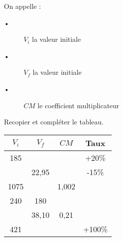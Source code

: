 

On appelle :
\begin{description}
\item[•] $V_i$ la valeur initiale
\item[•] $V_f$ la valeur initiale
\item[•] $CM$ le coefficient multiplicateur
\end{description}

Recopier et compléter le tableau. 

 \begin{tabular}{|c|c|c|c|}
 \hline 
$V_i$ & $V_f$ & $CM$ & Taux \\ 
 \hline 
 185 &   &   & +20\% \\ 
 \hline 
   & 22,95 &   & -15\% \\ 
 \hline 
 1075&   & 1,002 & \\ 
 \hline 
 240 & 180 &   &   \\ 
 \hline 
   & 38,10  & 0,21  &   \\ 
 \hline 
  421  &   &    &  +100\% \\ 
 \hline 
 \end{tabular} 